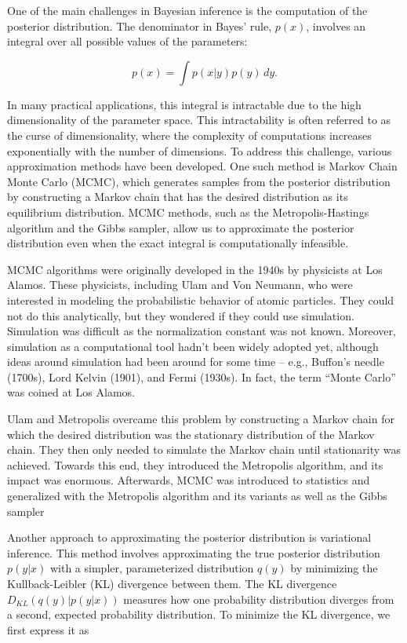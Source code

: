 One of the main challenges in Bayesian inference is the computation of the posterior distribution. The denominator in Bayes' rule, $p(x)$, involves an integral over all possible values of the parameters:

\begin{equation*}
p(x) = \int p(x \lvert y) p(y) \, dy.
\end{equation*}

In many practical applications, this integral is intractable due to the high dimensionality of the parameter space. This intractability is often referred to as the curse of dimensionality, where the complexity of computations increases exponentially with the number of dimensions. To address this challenge, various approximation methods have been developed. One such method is Markov Chain Monte Carlo (MCMC), which generates samples from the posterior distribution by constructing a Markov chain that has the desired distribution as its equilibrium distribution. MCMC methods, such as the Metropolis-Hastings algorithm and the Gibbs sampler, allow us to approximate the posterior distribution even when the exact integral is computationally infeasible.

MCMC algorithms were originally developed in the 1940s by physicists at Los Alamos. These physicists, including Ulam and Von Neumann, who were interested in modeling the probabilistic behavior of atomic particles. They could not do this analytically, but they wondered if they could use simulation. Simulation was difficult as the normalization constant was not known. Moreover, simulation as a computational tool hadn't been widely adopted yet, although ideas around simulation had been around for some time – e.g., Buffon's needle (1700s), Lord Kelvin (1901), and Fermi (1930s). In fact, the term “Monte Carlo” was coined at Los Alamos.

Ulam and Metropolis overcame this problem by constructing a Markov chain for which the desired distribution was the stationary distribution of the Markov chain. They then only needed to simulate the Markov chain until stationarity was achieved. Towards this end, they introduced the Metropolis algorithm, and its impact was enormous. Afterwards, MCMC was introduced to statistics and generalized with the Metropolis algorithm and its variants as well as the Gibbs sampler \parencite{Geman1984}

Another approach to approximating the posterior distribution is variational inference. This method involves approximating the true posterior distribution $p(y \lvert x)$ with a simpler, parameterized distribution $q(y)$ by minimizing the Kullback-Leibler (KL) divergence between them. The KL divergence $D_{KL}(q(y) \lvert p(y \lvert x))$ measures how one probability distribution diverges from a second, expected probability distribution. To minimize the KL divergence, we first express it as

